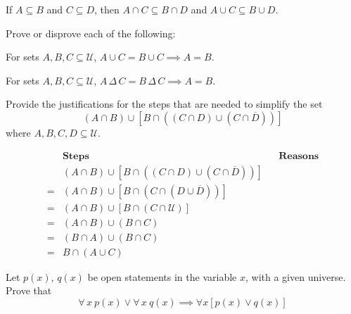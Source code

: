 \documentclass[a4paper, english, 12pt]{article} %
\begin{document}
\begin{subproblem}[1]
  If $ A \subseteq B$ and $C \subseteq D$, then $A \cap C \subseteq B \cap D$ and $A
  \cup C \subseteq B \cup D$.
\end{subproblem}

\begin{problem}
  Prove or disprove each of the following:
\end{problem}

\begin{subproblem}[2]
  For sets $A, B, C \subseteq \mathscr{U}$, $A \cup C = B \cup C \implies A = B$.
\end{subproblem}

\begin{subproblem}[4]
  For sets $A, B, C \subseteq \mathscr{U}$, $A\,\Delta\,C = B\,\Delta\,C \implies A
  = B$.
\end{subproblem}

\begin{problem}[16]
  Provide the justifications for the steps that are needed to simplify the set
  \begin{equation*}
    (A \cap B) \cup [ B \cap ((C \cap D) \cup (C \cap \overline{D})) ]
  \end{equation*}
  where $A, B, C, D \subseteq \mathscr{U}$.
\end{problem}

\begin{align*}
    & \textbf{Steps} && \textbf{Reasons} \\
    & (A \cap B) \cup [ B \cap ((C \cap D) \cup (C \cap \overline{D})) ]
    && \\
  = & (A \cap B) \cup [B \cap (C \cap (D \cup \overline{D}))]
    && \\
  = & (A \cap B) \cup [B \cap (C \cap \mathscr{U})]
    && \\
  = & (A \cap B) \cup (B \cap C)
    && \\ 
  = & (B \cap A) \cup (B \cap C)
    && \\
  = & B \cap (A \cup C) 
\end{align*}



\begin{problem}[8]
  \begin{subproblem}
    \label{problem:2.5.8.a}
    Let $p(x)$, $q(x)$ be open statements in the variable $x$, with a given
    universe. Prove that
    \begin{equation*}
      \forall\,x \ p(x) \vee \forall \, x \ q(x)
      \implies
      \forall x [p(x) \vee q(x)]
    \end{equation*}
  \end{subproblem}
\end{problem}
\end{document}
